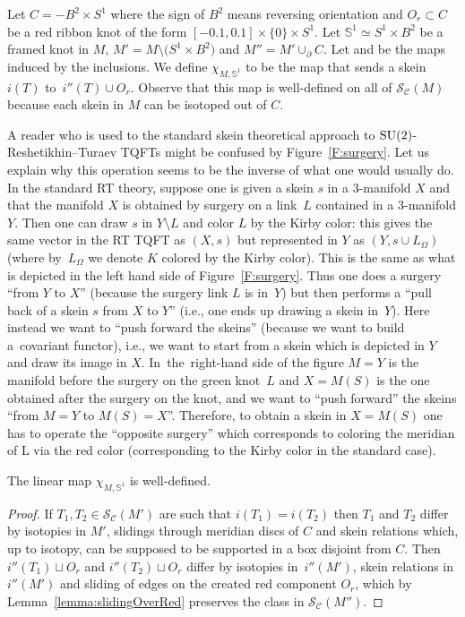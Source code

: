 \documentclass[pdftex]{sigma}
\numberwithin{equation}{section}
\newcommand{\tto}{\xrightarrow}
\numberwithin{theorem}{section}
\numberwithin{proposition}{section}
\numberwithin{definition}{section}
\numberwithin{lemma}{section}
\numberwithin{corollary}{section}
\numberwithin{remark}{section}
\numberwithin{example}{section}
\newcommand{\cat}{\mathcal{C}}
\newcommand{\TSkein}{{\mathscr{S}}}
\newcommand{\Sp}{\mathbb{S}}
\begin{document}
Let $C=-B^2\times S^1$ where the sign of $B^2$ means reversing
orientation and $O_r\subset C$
be a red ribbon knot of the form
$[-0.1,0.1]\times\{0\}\times S^1$. Let $\Sp^1\simeq S^1\times B^2$ be
a framed knot in $M$, $M'=M\setminus \bigl(S^1\times B^2\bigr)$ and
$M''=M'\cup_\partial C$. Let \smash{$\TSkein_\cat(M')\tto i\TSkein_\cat(M)$} and \smash{$\TSkein_\cat(M')\tto {i''}\TSkein_\cat(M'')$} be the
maps induced by the inclusions. We define $\chi_{M,\Sp^1}$ to be the
map that sends a skein $i(T)$ to~$i''(T)\cup O_r$.
 Observe that this map is well-defined on all of $\TSkein_\cat(M)$ because each skein in $M$ can be isotoped
 out of
 $C$.
\begin{remark}
A reader who is used to the standard skein theoretical approach to ${\rm SU}(2)$-Reshetikhin--Turaev TQFTs might be confused by Figure~\ref{F:surgery}. Let us explain why this operation seems to be the inverse of what one would usually do.
In the standard RT theory, suppose one is given a skein $s$ in a $3$-manifold $X$ and that the manifold $X$ is obtained by surgery on a link~$L$ contained in a $3$-manifold $Y$. Then one can draw $s$ in $Y\setminus L$ and color $L$ by the Kirby color: this gives the same vector in the RT TQFT as $(X,s)$ but represented in $Y$ as $(Y,s\cup L_\Omega)$ (where by~$L_\Omega$ we denote $K$ colored by the Kirby color). This is the same as what is depicted in the left hand side of Figure~\ref{F:surgery}.
Thus one does a surgery ``from $Y$ to $X$'' (because the surgery link $L$ is in~$Y$) but then performs a ``pull back of a skein $s$ from $X$ to $Y$'' (i.e., one ends up drawing a skein in~$Y$).
Here instead we want to ``push forward the skeins'' (because we want to build a~covariant functor), i.e., we want to start from a skein which is depicted in $Y$ and draw its image in $X$.
In~the~right-hand side of the figure $M=Y$ is the manifold before the surgery on the green knot~$L$ and $X=M(S)$ is the one obtained after the surgery on the knot, and we want to ``push forward'' the skeins ``from $M=Y$ to $M(S)=X$''. Therefore, to obtain a skein in $X=M(S)$ one has to operate the ``opposite surgery'' which corresponds to coloring the meridian of L via the red color (corresponding to the Kirby color in the standard case).
\end{remark}
\begin{proposition}
 The linear map $\chi_{M,\Sp^1}$ is well-defined.
\end{proposition}
\begin{proof}
If $T_1,T_2\in \TSkein_\cat(M')$ are such that $i(T_1)=i(T_2)$ then $T_1$ and $T_2$ differ by isotopies in $M'$, slidings through meridian discs of $C$ and skein relations which, up to isotopy, can be supposed to be supported in a box disjoint from $C$.
 Then $i''(T_1)\sqcup O_r$ and $i''(T_2)\sqcup O_r$ differ by isotopies in~$i''(M')$, skein relations in $i''(M')$ and sliding of edges on the created red component $O_r$, which by Lemma~\ref{lemma:slidingOverRed} preserves the class in $\TSkein_\cat(M'')$.
\end{proof}
\end{document}
